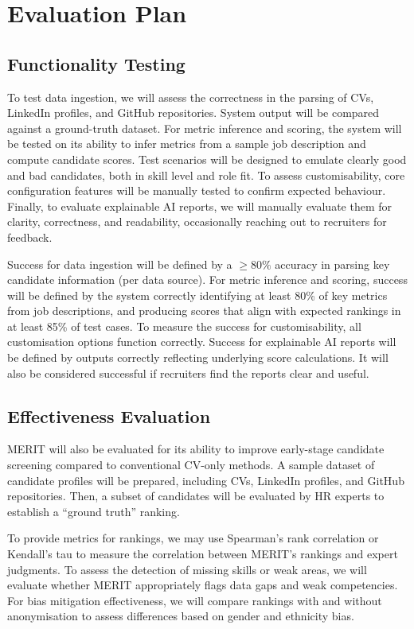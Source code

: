\chapter{Evaluation Plan}

\section{Functionality Testing}

To test data ingestion, we will assess the correctness in the parsing of CVs, LinkedIn profiles, and GitHub repositories. System output will be compared against a ground-truth dataset.
For metric inference and scoring, the system will be tested on its ability to infer metrics from a sample job description and compute candidate scores. Test scenarios will be designed to emulate clearly good and bad candidates, both in skill level and role fit.
To assess customisability, core configuration features will be manually tested to confirm expected behaviour.
Finally, to evaluate explainable AI reports, we will manually evaluate them for clarity, correctness, and readability, occasionally reaching out to recruiters for feedback.

Success for data ingestion will be defined by a $\geq 80\%$ accuracy in parsing key candidate information (per data source).
For metric inference and scoring, success will be defined by the system correctly identifying at least 80\% of key metrics from job descriptions, and producing scores that align with expected rankings in at least 85\% of test cases.
To measure the success for customisability, all customisation options function correctly.
Success for explainable AI reports will be defined by outputs correctly reflecting underlying score calculations.
It will also be considered successful if recruiters find the reports clear and useful.

\section{Effectiveness Evaluation}

MERIT will also be evaluated for its ability to improve early-stage candidate screening compared to conventional CV-only methods.
A sample dataset of candidate profiles will be prepared, including CVs, LinkedIn profiles, and GitHub repositories.
Then, a subset of candidates will be evaluated by HR experts to establish a “ground truth'' ranking.

To provide metrics for rankings, we may use Spearman's rank correlation or Kendall's tau to measure the correlation between MERIT's rankings and expert judgments.
To assess the detection of missing skills or weak areas, we will evaluate whether MERIT appropriately flags data gaps and weak competencies.
For bias mitigation effectiveness, we will compare rankings with and without anonymisation to assess differences based on gender and ethnicity bias.

